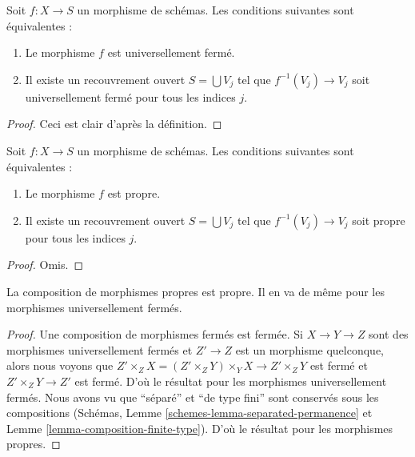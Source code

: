 \begin{lemma}
\label{lemma-universally-closed-local-on-the-base}
Soit $f : X \to S$ un morphisme de schémas. Les conditions
suivantes sont équivalentes :
\begin{enumerate}
\item Le morphisme $f$ est universellement fermé.
\item Il existe un recouvrement ouvert $S = \bigcup V_j$ tel que $f^{-1}(V_j) \to V_j$
soit universellement fermé pour tous les indices $j$.
\end{enumerate}
\end{lemma}

\begin{proof}
Ceci est clair d'après la définition.
\end{proof}

\begin{lemma}
\label{lemma-proper-local-on-the-base}
Soit $f : X \to S$ un morphisme de schémas. Les conditions
suivantes sont équivalentes :
\begin{enumerate}
\item Le morphisme $f$ est propre.
\item Il existe un recouvrement ouvert $S = \bigcup V_j$ tel que
$f^{-1}(V_j) \to V_j$ soit propre pour tous les indices $j$.
\end{enumerate}
\end{lemma}

\begin{proof}
Omis.
\end{proof}

\begin{lemma}
\label{lemma-composition-proper}
La composition de morphismes propres est propre. Il en
va de même pour les morphismes universellement fermés.
\end{lemma}

\begin{proof}
Une composition de morphismes fermés est
fermée. Si $X \to Y \to Z$ sont des morphismes universellement
fermés et $Z' \to Z$ est un morphisme
quelconque, alors nous voyons que $Z' \times_Z X = (Z' \times_Z Y) \times_Y X  \to Z' \times_Z Y$ est fermé
et $Z' \times_Z Y \to Z'$ est fermé. D'où le résultat pour
les morphismes universellement fermés. Nous
avons vu que ``séparé'' et ``de
type fini'' sont
conservés sous les compositions (Schémas, Lemme \ref{schemes-lemma-separated-permanence}
et Lemme \ref{lemma-composition-finite-type}). D'où le résultat pour
les morphismes propres.
\end{proof}

